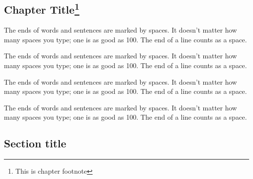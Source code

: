 \cleardoublepage

\begin{frontmatter}
	\chapter{Chapter Title\footnote{This is chapter footnote}}\label{chap2}

	\begin{aug}
		\author[addressrefs={ad1,ad2}]%
		{   }%
		\author[addressrefs={ad2}]%
		{ }%
		\address[id=ad1]%
		{Short Address}%
		\address[id=ad2]%
		{Long Address}%
	\end{aug}


	\begin{chapterpoints}%
		\item The ends of words and sentences are marked by spaces. It doesn't
		matter how many spaces you type; one is as good as 100.  The end of
		a line counts as a space.

		\item The ends of words and sentences are marked by spaces. It doesn't
		matter how many spaces you type; one is as good as 100.  The end of
		a line counts as a space.
	\end{chapterpoints}

	\begin{dispquote}

		The ends of words and sentences are marked by spaces. It doesn't
		matter how many spaces you type; one is as good as 100.  The end of
		a line counts as a space.

		The ends of words and sentences are marked by spaces. It doesn't
		matter how many spaces you type; one is as good as 100.  The end of
		a line counts as a space.


	\end{dispquote}

\end{frontmatter}

\section{Section title}\label{sec2.1}

